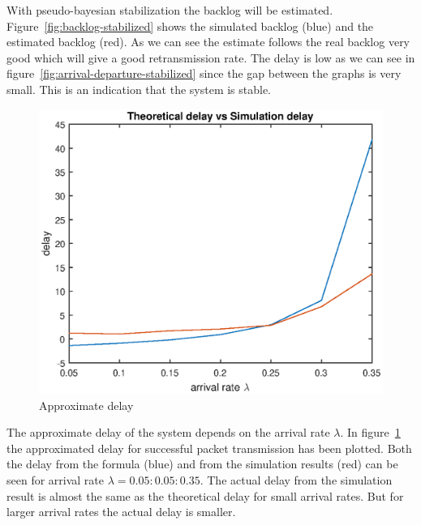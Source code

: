 \documentclass{article}
\begin{document}
With pseudo-bayesian stabilization the backlog will be estimated. Figure~\ref{fig:backlog-stabilized} shows the simulated backlog (blue) and the estimated backlog (red). As we can see the estimate follows the real backlog very good which will give a good retransmission rate. The delay is low as we can see in figure~\ref{fig:arrival-departure-stabilized} since the gap between the graphs is very small. This is an indication that the system is stable.

\begin{figure}[h]
  \centering
  \includegraphics[width=.5\textwidth]{figures/approximate-delay.eps}
  \caption{Approximate delay}
  \label{fig:approximate-delay}
\end{figure}

The approximate delay of the system depends on the arrival rate $\lambda$. In figure~\ref{fig:approximate-delay} the approximated delay for successful packet transmission has been plotted. Both the delay from the formula (blue) and from the simulation results (red) can be seen for arrival rate $\lambda = 0.05:0.05:0.35$. The actual delay from the simulation result is almost the same as the theoretical delay for small arrival rates. But for larger arrival rates the actual delay is smaller. 
\end{document}
